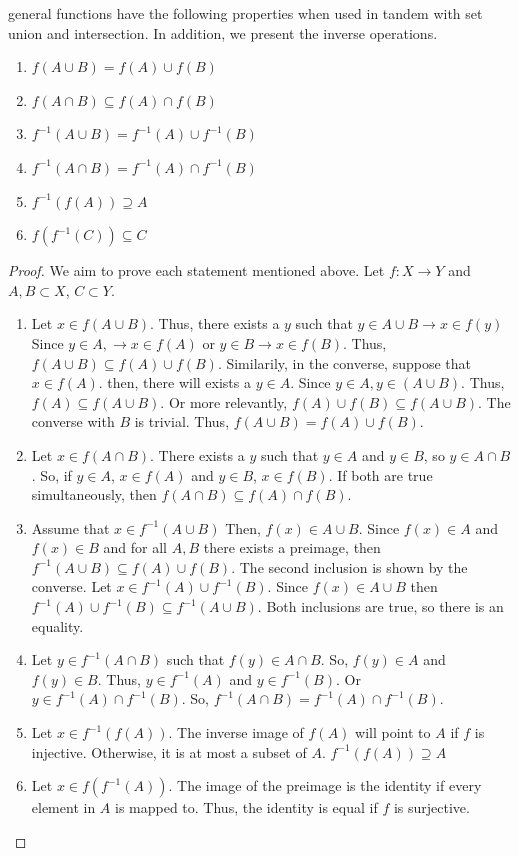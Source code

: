 \begin{definition}
    general functions have the following properties when used in tandem with set union and intersection. In addition, we present the inverse operations. 

    \begin{enumerate}[label=\alph*.]
        \item $f(A\cup B) = f(A) \cup f(B)$
        \item $f(A\cap B) \subseteq f(A) \cap f(B)$
        \item $f^{-1}(A\cup B) = f^{-1}(A) \cup f^{-1}(B)$
        \item $f^{-1}(A\cap B) = f^{-1}(A) \cap f^{-1}(B)$
        \item $f^{-1}(f(A)) \supseteq A$
        \item $f(f^{-1}(C)) \subseteq C$
    \end{enumerate}
\end{definition}
\begin{proof}
    We aim to prove each statement mentioned above. Let $f:X \rightarrow Y$ and $A, B\subset X$, $C\subset Y$. 
    \begin{enumerate}[label=\alph*.]
        \item  Let $x\in f(A\cup B)$. Thus, there exists a $y$ such that $y \in A\cup B \rightarrow x \in f(y)$ Since $y\in A, \rightarrow x \in f(A)$ or $y\in B \rightarrow x \in f(B)$. Thus, $f(A\cup B) \subseteq f(A) \cup f(B)$. Similarily, in the converse, suppose that $x\in f(A)$. then, there will exists a $y\in A$. Since $y \in A, y\in (A\cup B)$. Thus, $f(A) \subseteq f(A\cup B)$. Or more relevantly, $f(A) \cup f(B) \subseteq f(A\cup B)$. The converse with $B$ is trivial. Thus,  $f(A\cup B) = f(A) \cup f(B)$.
        \item Let $x\in f(A \cap B)$. There exists a $y$ such that $y\in A$ and $y\in B$, so $y \in A\cap B$. So, if $y\in A$, $x\in f(A)$ and $y\in B$, $x\in f(B)$. If both are true simultaneously, then $f(A\cap B) \subseteq f(A) \cap f(B)$. 
        \item Assume that $x \in f^{-1}(A\cup B)$ Then, $f(x) \in A \cup B$. Since $f(x) \in A$ and $f(x) \in B$ and for all $A, B$ there exists a preimage, then $f^{-1}(A\cup B) \subseteq f(A) \cup f(B)$. The second inclusion is shown by the converse. Let $x\in f^{-1}(A) \cup f^{-1}(B)$. Since $f(x) \in A \cup B$ then $f^{-1}(A) \cup f^{-1}(B) \subseteq f^{-1}(A\cup B)$. Both inclusions are true, so there is an equality.
        \item Let $y \in f^{-1}(A\cap B)$ such that $f(y) \in A \cap B$. So, $f(y) \in A$ and $f(y)\in B$. Thus, $y \in f^{-1}(A)$ and $y \in f^{-1}(B)$. Or $y\in f^{-1}(A) \cap f^{-1}(B)$. So, $f^{-1}(A\cap B) = f^{-1}(A) \cap f^{-1}(B)$.
        \item Let $x \in f^{-1}(f(A))$. The inverse image of $f(A)$ will point to $A$ if $f$ is injective. Otherwise, it is at most a subset of $A$. $f^{-1}(f(A)) \supseteq A$ 
        \item Let $x \in f(f^{-1}(A))$. The image of the preimage is the identity if every element in $A$ is mapped to. Thus, the identity is equal if $f$ is surjective. 
    \end{enumerate}
\end{proof}

